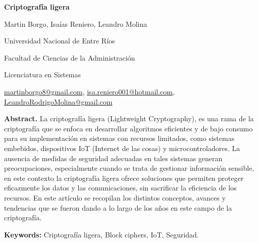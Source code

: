 \documentclass[a4paper,10pt]{article}
\begin{document}
	\pagestyle{empty}
	\begin{titlepage}
		\centering
		\vspace*{1.5cm}
		{\fontsize{14}{17}\bfseries Criptografía ligera\par}
		{\small Martin Borgo, Isaías Reniero, Leandro Molina\par}
		{\normalsize Universidad Nacional de Entre Ríos\par}
		{\normalsize Facultad de Ciencias de la Administración\par}
		{\normalsize Licenciatura en Sistemas\par}
		{\small \href{mailto:martinborgo8@gmail.com}{martinborgo8@gmail.com}, \href{mailto:isa.reniero001@hotmail.com}{isa.reniero001@hotmail.com}, \href{mailto:LeandroRodrigoMolina@gmail.com}{LeandroRodrigoMolina@gmail.com}\par}
		{\small \justify\textbf{Abstract.} La criptografía ligera (Lightweight Cryptography), es una rama de la criptografía que se enfoca en desarrollar algoritmos eficientes y de bajo consumo para su implementación en sistemas con recursos limitados, como sistemas embebidos, dispositivos IoT (Internet de las cosas) y microcontroladores. La ausencia de medidas de seguridad adecuadas en tales sistemas generan preocupaciones, especialmente cuando se trata de gestionar información sensible, en este contexto la criptografía ligera ofrece soluciones que permiten proteger eficazmente los datos y las comunicaciones, sin sacrificar la eficiencia de los recursos. En este artículo se recopilan los distintos conceptos, avances y tendencias que se fueron dando a lo largo de los años en este campo de la criptografía.\par}
		
		{\small \justify\textbf{Keywords:} Criptografía ligera, Block ciphers, IoT, Seguridad. \par}
	\end{titlepage}
	
\end{document}
